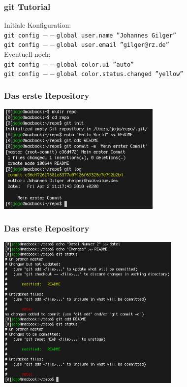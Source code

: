 \begin{frame}
  \frametitle{git Tutorial}
  Initiale Konfiguration: \\
  {\tt \small git config $--$global user.name ''Johannes Gilger''} \\ 
  {\tt \small git config $--$global user.email ''gilger@rz.de''} \\
  \vspace{0.5cm}
  Eventuell noch: \\
  {\tt \small git config $--$global color.ui ''auto''} \\ 
  {\tt \small git config $--$global color.status.changed ''yellow''} \\ 
\end{frame}

\begin{frame}
  \frametitle{Das erste Repository}
  \vspace{-0.3cm}
  \begin{center}
    \includegraphics[width=8cm]{img/tutorial_1.png}
  \end{center}
\end{frame}

\begin{frame}
  \frametitle{Das erste Repository}
  \vspace{-0.3cm}
  \begin{center}
    \includegraphics[width=9cm]{img/tutorial_2.png}
  \end{center}
\end{frame}

